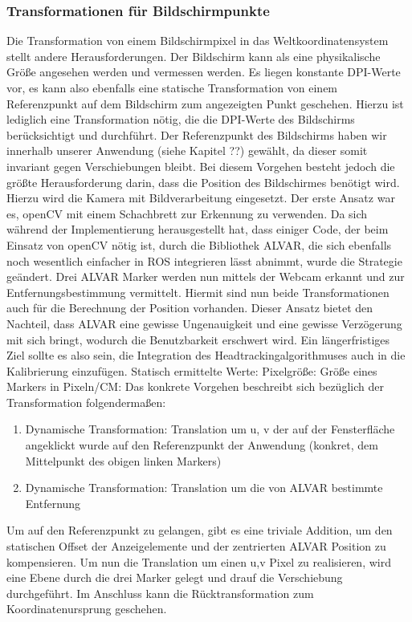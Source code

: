 \subsubsection{Transformationen für Bildschirmpunkte}
\label{ssection:alva}
Die Transformation von einem Bildschirmpixel in das Weltkoordinatensystem stellt andere Herausforderungen. Der Bildschirm kann als eine physikalische Größe angesehen werden und vermessen werden. Es liegen konstante DPI-Werte vor, es kann also ebenfalls eine statische Transformation von einem Referenzpunkt auf dem Bildschirm zum angezeigten Punkt geschehen. Hierzu ist lediglich eine Transformation nötig, die die DPI-Werte des Bildschirms berücksichtigt und durchführt. Der Referenzpunkt des Bildschirms haben wir innerhalb unserer Anwendung (siehe Kapitel ??) gewählt, da dieser somit invariant gegen Verschiebungen bleibt. Bei diesem Vorgehen besteht jedoch die größte Herausforderung darin, dass die Position des Bildschirmes benötigt wird. Hierzu wird die Kamera mit Bildverarbeitung eingesetzt. Der erste Ansatz war es, openCV mit einem Schachbrett zur Erkennung zu verwenden. Da sich während der Implementierung herausgestellt hat, dass einiger Code, der beim Einsatz von openCV nötig ist, durch die Bibliothek ALVAR, die sich ebenfalls noch wesentlich einfacher in ROS integrieren lässt abnimmt, wurde die Strategie geändert. Drei ALVAR Marker werden nun mittels der Webcam erkannt und zur Entfernungsbestimmung vermittelt. Hiermit sind nun beide Transformationen auch für die Berechnung der Position vorhanden. Dieser Ansatz bietet den Nachteil, dass ALVAR eine gewisse Ungenauigkeit und eine gewisse Verzögerung mit sich bringt, wodurch die Benutzbarkeit erschwert wird. Ein längerfristiges Ziel sollte es also sein, die Integration des Headtrackingalgorithmuses auch in die Kalibrierung einzufügen.
    Statisch ermittelte Werte:
    Pixelgröße:
    Größe eines Markers in Pixeln/CM:
Das konkrete Vorgehen beschreibt sich bezüglich der Transformation folgendermaßen:

   \begin{enumerate}
      \item Dynamische Transformation:  Translation  um u, v der auf der Fensterfläche angeklickt wurde auf den Referenzpunkt der Anwendung (konkret, dem Mittelpunkt des obigen linken Markers) 
      \item Dynamische Transformation: Translation um die von ALVAR bestimmte Entfernung
   \end{enumerate}

Um auf den Referenzpunkt zu gelangen, gibt es eine triviale Addition, um den statischen Offset der Anzeigelemente und der zentrierten ALVAR Position zu kompensieren. Um nun die Translation um einen u,v Pixel zu realisieren, wird eine Ebene durch die drei Marker gelegt und drauf die Verschiebung durchgeführt. Im Anschluss kann die Rücktransformation zum Koordinatenursprung geschehen.



